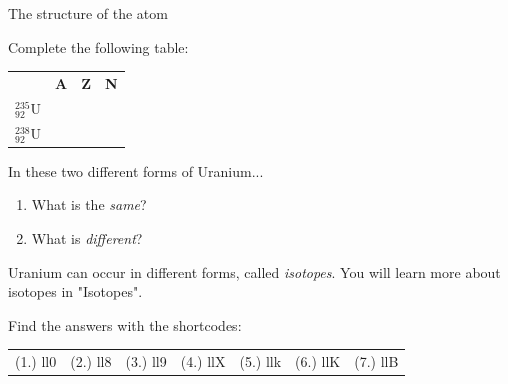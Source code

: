 \begin{exercises}{The structure of the atom}
\begin{enumerate}[noitemsep, label=\textbf{\arabic*}. ]
Complete the following table:
          \begin{table}[H]
        \begin{center}
      \label{m38745*id257121}
    \noindent
      \tablelasttail{}
      \begin{xtabular}[t]{|l|l|l|l|}\hline
         &
        \textbf{A} &
        \textbf{Z} &
        \textbf{N}%
     \tabularnewline{}
        $_{92}^{235}\mathrm{U}$ &
         &
         &
     \tabularnewline{}
        $_{92}^{238}\mathrm{U}$ &
         &
         &
     \tabularnewline{}
    \end{xtabular}
      \end{center}
\end{table}
    \par
In these two different forms of Uranium...
\label{m38745*id257277}\begin{enumerate}[noitemsep, label=\textbf{\alph*}. ] 
            \label{m38745*uid38}\item What is the \textsl{same}?
\label{m38745*uid39}\item What is \textsl{different}?
\end{enumerate}
Uranium can occur in different forms, called \textsl{isotopes}. You will learn more about isotopes in "Isotopes".\newline
\end{enumerate}
  \label{m38745**end}
\par {} Find the answers with the shortcodes:
 \par \begin{tabular}[h]{cccccc}
 (1.) ll0  &  (2.) ll8  &  (3.) ll9  &  (4.) llX  &  (5.) llk  &  (6.) llK  &  (7.) llB  & \end{tabular}

\end{exercises}
